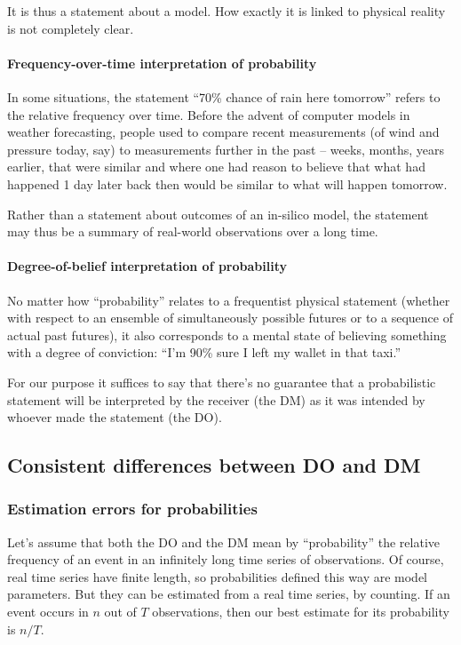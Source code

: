\documentclass[a4paper, 12pt]{article}
\newcommand{\seclabel}[1]{\label{sec:#1}}
\begin{document}
It is thus a statement about a model. How exactly it is linked to physical reality is not completely clear. 


\paragraph{Frequency-over-time interpretation of probability}
In some situations, the statement ``70\% chance of rain here tomorrow'' refers to the relative frequency over time. Before the advent of computer models in weather forecasting, people used to compare recent measurements (of wind and pressure today, say) to measurements further in the past -- weeks, months, years earlier, that were similar and where one had reason to believe that what had happened 1 day later back then would be similar to what will happen tomorrow.

Rather than a statement about outcomes of an in-silico model, the statement may thus be a summary of real-world observations over a long time.

\paragraph{Degree-of-belief interpretation of probability}
No matter how ``probability'' relates to a frequentist physical statement (whether with respect to an ensemble of simultaneously possible futures or to a sequence of actual past futures), it also corresponds to a mental state of believing something with a degree of conviction: ``I'm 90\% sure I left my wallet in that taxi.''

For our purpose it suffices to say that there's no guarantee that a probabilistic statement will be interpreted by the receiver (the DM) as it was intended by whoever made the statement (the DO).

\subsection{Consistent differences between DO and DM \seclabel{condition2}}

\subsubsection*{Estimation errors for probabilities}
Let's assume that both the DO and the DM mean by ``probability'' the relative frequency of an event in an infinitely long time series of observations. Of course, real time series have finite length, so probabilities defined this way are model parameters. But they can be estimated from a real time series, by counting. If an event occurs in $n$ out of $T$ observations, then our best estimate for its probability is $n/T$.
\end{document}
